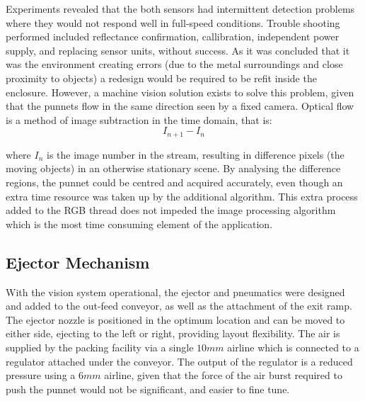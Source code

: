 \documentclass[fleqn,twoside,12pt]{report}
\begin{document}
Experiments revealed that the both sensors had intermittent detection problems where they would not respond well in full-speed conditions. Trouble shooting performed included reflectance confirmation, callibration, independent power supply, and replacing sensor units, without success. As it was concluded that it was the environment creating errors (due to the metal surroundings and close proximity to objects) a redesign would be required to be refit inside the enclosure. However, a machine vision solution exists to solve this problem, given that the punnets flow in the same direction seen by a fixed camera. Optical flow is a method of image subtraction in the time domain, that is:
\begin{equation}
	I_{n+1} - I_n
\end{equation}

where $I_n$ is the image number in the stream, resulting in difference pixels (the moving objects) in an otherwise stationary scene. By analysing the difference regions, the punnet could be centred and acquired accurately, even though an extra time resource was taken up by the additional algorithm. This extra process added to the RGB thread does not impeded the image processing algorithm which is the most time consuming element of the application.

\subsection{Ejector Mechanism}

With the vision system operational, the ejector and pneumatics were designed and added to the out-feed conveyor, as well as the attachment of the exit ramp. The ejector nozzle is positioned in the optimum location and can be moved to either side, ejecting to the left or right, providing layout flexibility. The air is supplied by the packing facility via a single $10mm$ airline which is connected to a regulator attached under the conveyor. The output of the regulator is a reduced pressure using a $6mm$ airline, given that the force of the air burst required to push the punnet would not be significant, and easier to fine tune.
\end{document}
